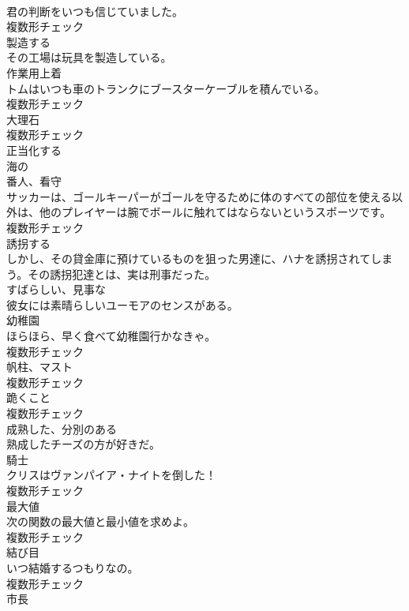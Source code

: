 \documentclass[8pt]{extreport}
\begin{document}
\begin{CJK}{UTF8}{min}
\\	君の判断をいつも信じていました。	
\\	複数形チェック
\\	[動詞]	製造する	
\\	その工場は玩具を製造している。	
\\	[名詞]	作業用上着	
\\	トムはいつも車のトランクにブースターケーブルを積んでいる。	
\\	複数形チェック
\\	[名詞]	大理石	
\\	複数形チェック
\\	[動詞]	正当化する	
\\	[形容詞]	海の	
\\	[名詞]	番人、看守	
\\	サッカーは、ゴールキーパーがゴールを守るために体のすべての部位を使える以外は、他のプレイヤーは腕でボールに触れてはならないというスポーツです。	
\\	複数形チェック
\\	[動詞]	誘拐する	
\\	しかし、その貸金庫に預けているものを狙った男達に、ハナを誘拐されてしまう。その誘拐犯達とは、実は刑事だった。	
\\	[形容詞]	すばらしい、見事な	
\\	彼女には素晴らしいユーモアのセンスがある。	
\\	[名詞]	幼稚園	
\\	ほらほら、早く食べて幼稚園行かなきゃ。	
\\	複数形チェック
\\	[名詞]	帆柱、マスト	
\\	複数形チェック
\\	[名詞]	跪くこと	
\\	複数形チェック
\\	[形容詞]	成熟した、分別のある	
\\	熟成したチーズの方が好きだ。	
\\	[名詞]	騎士	
\\	クリスはヴァンパイア・ナイトを倒した！	
\\	複数形チェック
\\	[名詞]	最大値	
\\	次の関数の最大値と最小値を求めよ。	
\\	複数形チェック
\\	[名詞]	結び目	
\\	いつ結婚するつもりなの。	
\\	複数形チェック
\\	[名詞]	市⻑	

\end{CJK}
\end{document}
